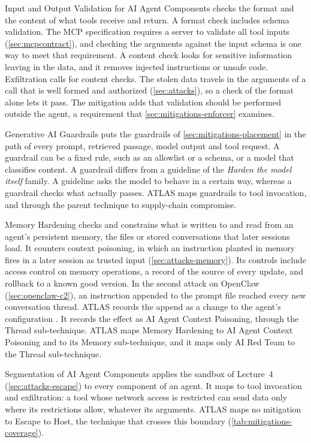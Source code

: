 Input and Output Validation for AI Agent Components checks the format and the content of what tools
receive and return. A format check includes schema validation. The MCP specification requires a
server to validate all tool inputs (\cref{sec:mcpcontract}), and checking the arguments against the
input schema is one way to meet that requirement. A content check looks
for sensitive information leaving in the data, and it removes injected instructions or unsafe code.
Exfiltration calls for content checks. The stolen data travels in the arguments of a call that is
well formed and authorized (\cref{sec:attacks}), so a check of the format alone lets it pass. The
mitigation adds that validation should be performed outside the agent, a requirement that
\cref{sec:mitigations-enforcer} examines.

Generative AI Guardrails puts the guardrails of \cref{sec:mitigations-placement} in the path of
every prompt, retrieved passage, model output and tool request. A guardrail can be a fixed rule,
such as an allowlist or a schema, or a model that classifies content. A guardrail differs from a
guideline of the \emph{Harden the model itself} family. A guideline asks the model to behave in a
certain way, whereas a guardrail checks what actually passes. ATLAS maps guardrails to tool
invocation, and through the parent technique to supply-chain compromise.

Memory Hardening checks and constrains what is written to and read from an agent's persistent
memory, the files or stored conversations that later sessions load. It counters context poisoning,
in which an instruction planted in memory fires in a later session as trusted input
(\cref{sec:attacks-memory}). Its controls include access control on memory operations, a record of
the source of every update, and rollback to a known good version. In the second attack on OpenClaw
(\cref{sec:openclaw-c2}), an instruction appended to the prompt file  reached
every new conversation thread. ATLAS records the append as a change to the agent's configuration
\citep{atlas-cs0051-openclaw-c2}. It records the effect as AI Agent Context Poisoning, through the
Thread sub-technique. ATLAS maps Memory Hardening to AI Agent Context Poisoning and to its Memory
sub-technique, and it maps only AI Red Team to the Thread sub-technique.

Segmentation of AI Agent Components applies the sandbox of Lecture~4 (\cref{sec:attacks-escape}) to
every component of an agent. It maps to tool invocation and exfiltration: a tool whose network access is restricted can send data
only where its restrictions allow, whatever its arguments. ATLAS maps no mitigation to Escape to
Host, the technique that crosses this boundary (\cref{tab:mitigations-coverage}).

